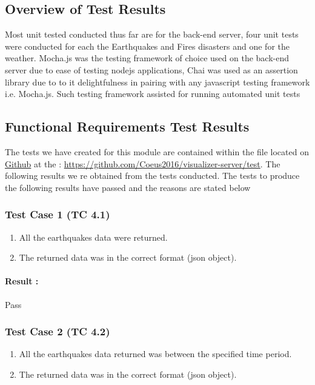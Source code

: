 \subsection{Overview of Test Results}

Most unit tested conducted thus far are for the back-end server, four unit tests were conducted for each the Earthquakes and Fires disasters and one for the weather. Mocha.js was the testing framework of choice used on the back-end server due to ease of testing nodejs applications, Chai was used as an assertion library due to to it delightfulness in pairing with any javascript testing framework i.e. Mocha.js. Such testing framework assisted for running automated unit tests

\subsection{Functional Requirements Test Results}

The tests we have created for this module are contained within the file
located on \href{https://github.com}{Github} at the : \url{https://github.com/Coeus2016/visualizer-server/test}. The following results we re obtained from the tests conducted. The tests to produce the following results have passed and the reasons are stated below \\

\subsubsection{Test Case 1 (TC 4.1)}

\begin{enumerate}
	\item All the earthquakes data were returned.
	\item The returned data was in the correct format (json object).
\end{enumerate}

\paragraph{Result :} Pass

\subsubsection{Test Case 2 (TC 4.2)}

\begin{enumerate}
	\item All the earthquakes data returned was between the specified time period.
	\item The returned data was in the correct format (json object).
\end{enumerate}


